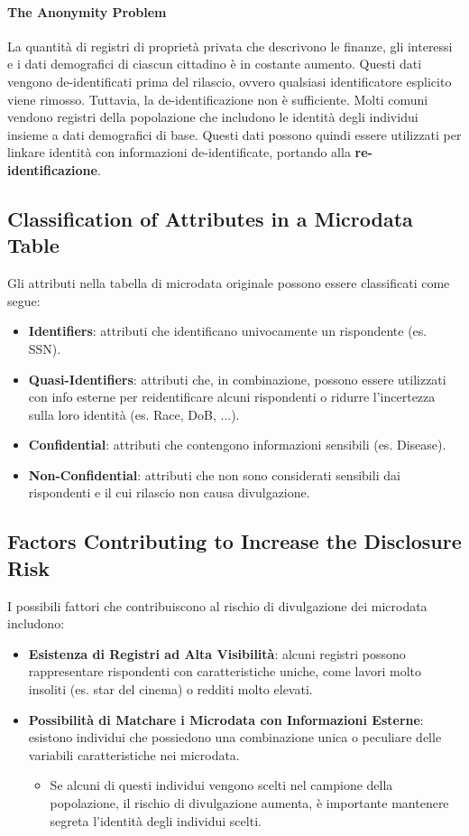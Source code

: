\documentclass{report}
\begin{document}
\paragraph{The Anonymity Problem}
La quantità di registri di proprietà privata che descrivono le finanze, gli interessi e i dati demografici di ciascun cittadino è in costante aumento. 
Questi dati vengono de-identificati prima del rilascio, ovvero qualsiasi identificatore esplicito viene rimosso. Tuttavia, la de-identificazione non è sufficiente. 
Molti comuni vendono registri della popolazione che includono le identità degli individui insieme a dati demografici di base. 
Questi dati possono quindi essere utilizzati per linkare identità con informazioni de-identificate, portando alla \textbf{re-identificazione}.

\subsection{Classification of Attributes in a Microdata Table}
Gli attributi nella tabella di microdata originale possono essere classificati come segue:
\begin{itemize}
    \item \textbf{Identifiers}: attributi che identificano univocamente un rispondente (es. SSN).
    \item \textbf{Quasi-Identifiers}: attributi che, in combinazione, possono essere utilizzati con info esterne per reidentificare alcuni rispondenti o ridurre l'incertezza sulla loro identità (es. Race, DoB, ...).
    \item \textbf{Confidential}: attributi che contengono informazioni sensibili (es. Disease).
    \item \textbf{Non-Confidential}: attributi che non sono considerati sensibili dai rispondenti e il cui rilascio non causa divulgazione.
\end{itemize}

\subsection{Factors Contributing to Increase the Disclosure Risk}
I possibili fattori che contribuiscono al rischio di divulgazione dei microdata includono:

\begin{itemize}
    \item \textbf{Esistenza di Registri ad Alta Visibilità}: alcuni registri possono rappresentare rispondenti con caratteristiche uniche, come lavori molto insoliti (es. star del cinema) o redditi molto elevati.
    \item \textbf{Possibilità di Matchare i Microdata con Informazioni Esterne}: esistono individui che possiedono una combinazione unica o peculiare delle variabili caratteristiche nei microdata. 
    \begin{itemize}
        \item Se alcuni di questi individui vengono scelti nel campione della popolazione, il rischio di divulgazione aumenta, è importante mantenere segreta l'identità degli individui scelti.
    \end{itemize}
\end{itemize}
\end{document}
